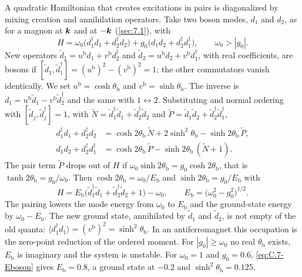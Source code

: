 A quadratic Hamiltonian that creates excitations in pairs is diagonalized by mixing creation and annihilation operators. Take two boson modes, $d_1$ and $d_2$, as for a magnon at $\bm{k}$ and at $-\bm{k}$ (\cref{sec:7.1}), with
\begin{equation}
  H = \omega_0\bigl(d_1^\dagger d_1 + d_2^\dagger d_2\bigr) + g_0\bigl(d_1d_2 + d_2^\dagger d_1^\dagger\bigr), \qquad \omega_0 > |g_0| .
  \label{eq:C.7-Hboson}
\end{equation}
New operators $\tilde d_1 = u^{\mathrm{b}}d_1 + v^{\mathrm{b}}d_2^\dagger$ and $\tilde d_2 = u^{\mathrm{b}}d_2 + v^{\mathrm{b}}d_1^\dagger$, with real coefficients, are bosons if $[\tilde d_1, \tilde d_1^\dagger] = (u^{\mathrm{b}})^2 - (v^{\mathrm{b}})^2 = 1$; the other commutators vanish identically. We set $u^{\mathrm{b}} = \cosh\theta_{\mathrm{b}}$ and $v^{\mathrm{b}} = \sinh\theta_{\mathrm{b}}$. The inverse is $d_1 = u^{\mathrm{b}}\tilde d_1 - v^{\mathrm{b}}\tilde d_2^\dagger$ and the same with $1 \leftrightarrow 2$. Substituting and normal ordering with $[\tilde d_j, \tilde d_j^\dagger] = 1$, with $\tilde N = \tilde d_1^\dagger\tilde d_1 + \tilde d_2^\dagger\tilde d_2$ and $\tilde P = \tilde d_1\tilde d_2 + \tilde d_2^\dagger\tilde d_1^\dagger$,
\begin{align*}
  d_1^\dagger d_1 + d_2^\dagger d_2 &= \cosh2\theta_{\mathrm{b}}\,\tilde N + 2\sinh^2\theta_{\mathrm{b}} - \sinh2\theta_{\mathrm{b}}\,\tilde P ,\\
  d_1d_2 + d_2^\dagger d_1^\dagger &= \cosh2\theta_{\mathrm{b}}\,\tilde P - \sinh2\theta_{\mathrm{b}}\,(\tilde N + 1) .
\end{align*}
The pair term $\tilde P$ drops out of $H$ if $\omega_0\sinh2\theta_{\mathrm{b}} = g_0\cosh2\theta_{\mathrm{b}}$, that is $\tanh2\theta_{\mathrm{b}} = g_0/\omega_0$. Then $\cosh2\theta_{\mathrm{b}} = \omega_0/E_{\mathrm{b}}$ and $\sinh2\theta_{\mathrm{b}} = g_0/E_{\mathrm{b}}$ with
\begin{equation}
  H = E_{\mathrm{b}}\bigl(\tilde d_1^\dagger\tilde d_1 + \tilde d_2^\dagger\tilde d_2 + 1\bigr) - \omega_0, \qquad E_{\mathrm{b}} = \bigl(\omega_0^2 - g_0^2\bigr)^{1/2} .
  \label{eq:C.7-Eboson}
\end{equation}
The pairing lowers the mode energy from $\omega_0$ to $E_{\mathrm{b}}$ and the ground-state energy by $\omega_0 - E_{\mathrm{b}}$. The new ground state, annihilated by $\tilde d_1$ and $\tilde d_2$, is not empty of the old quanta: $\langle d_1^\dagger d_1\rangle = (v^{\mathrm{b}})^2 = \sinh^2\theta_{\mathrm{b}}$. In an antiferromagnet this occupation is the zero-point reduction of the ordered moment. For $|g_0| \ge \omega_0$ no real $\theta_{\mathrm{b}}$ exists, $E_{\mathrm{b}}$ is imaginary and the system is unstable. For $\omega_0 = 1$ and $g_0 = 0.6$, \cref{eq:C.7-Eboson} gives $E_{\mathrm{b}} = 0.8$, a ground state at $-0.2$ and $\sinh^2\theta_{\mathrm{b}} = 0.125$.

